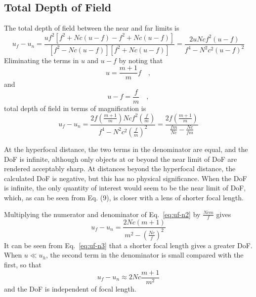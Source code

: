 \documentclass[11pt, oneside]{scrartcl}   	%
\begin{document}
\subsection{Total Depth of Field}

The total depth of field between the near and far limits is
\begin{equation}
     u_f-u_n = \frac{uf^2 \left[f^2 +N\!c(u- f)- f^2 +N\!c(u-f)\right]}{\left[f^2 -N\!c(u-f)\right]\left[f^2 +N\!c(u-f)\right]} = 
     \frac{ 2uN\!cf^2 (u- f)}{f^4 -N^2c^2(u-f)^2}
   \label{eq:uf-n1}
\end{equation}
Eliminating the terms in $u$ and $u - f$ by noting that 
\begin{equation}
u = \frac{m+1}m f\quad ,
\end{equation}
and
\begin{equation}
    u-f = \frac f m\quad,
\end{equation}
total depth of field in terms of magnification is
\begin{equation}
u_f-u_n = \frac{2f\left(\frac{m+1}m\right)N\!cf^2\left(\frac f m\right)}{f^4 -N^2c^2\left(\frac f m\right)^2} = \frac{2f\left(\frac{m+1}m\right)}{\frac{fm}{N\!c}-\frac{N\!c}{fm}}
\label{eq:uf-n2}
\end{equation}

At the hyperfocal distance, the two terms in the denominator are equal, and the DoF is infinite, although only objects at or beyond the near limit of DoF are rendered acceptably sharp. At distances beyond the hyperfocal distance, the calculated DoF is negative, but this has no physical significance. When the DoF is infinite, the only quantity of interest would seem to be the near limit of DoF, which, as can be seen from Eq. (9), is closer with a lens of shorter focal length.

Multiplying the numerator and denominator of Eq.~\ref{eq:uf-n2} by $\frac{N\!cm}f$
gives
\begin{equation}
   u_f-u_n = \frac{2N\!c(m+1)}{m^2-\left(\frac{N\!c}f\right)^2}
      \label{eq:uf-n3}
\end{equation}
It can be seen from Eq.~\ref{eq:uf-n3} that a shorter focal length
gives a greater DoF. When $u \ll u_h$, the second term in the denominator is small compared with the first, so that
\begin{equation}
   u_f-u_n \approx 2N\!c\frac{m+1}{m^2}
   \label{eq:uf-n4}
\end{equation}
and the DoF is independent of focal length.
\end{document}
